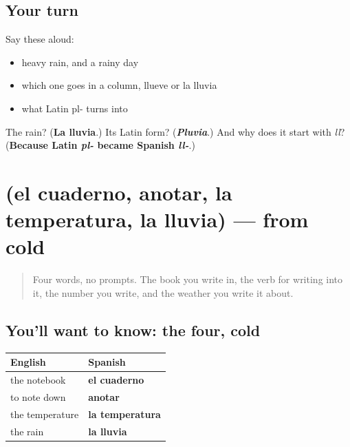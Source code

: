 \subsection*{Your turn}
Say these aloud:

\begin{itemize}
\raggedright
  \item heavy rain, and a rainy day
  \item which one goes in a column, llueve or la lluvia
  \item what Latin pl- turns into
\end{itemize}

\begin{tcolorbox}[breakable,colback=teal!4,colframe=teal!35!black,title={Before you move on}]
The rain? (\textbf{La lluvia}.) Its Latin form? (\emph{\textbf{Pluvia}}.) And why does it start with \emph{ll}? (\textbf{Because Latin \emph{pl-} became Spanish \emph{ll-}}.)
\end{tcolorbox}
\section[(el cuaderno, anotar, la temperatura …]{(el cuaderno, anotar, la temperatura, la lluvia) — from cold}

\label{lesson:ES-R465-repaso-apunte}



\begin{quote}
Four words, no prompts. The book you write in, the verb for writing into it, the number you write, and the weather you write it about.
\end{quote}

\subsection*{You'll want to know: the four, cold}
\noindent
\begin{tabularx}{\linewidth}{@{}>{\raggedright\arraybackslash}X>{\raggedright\arraybackslash}X@{}}
\toprule
\textbf{English} & \textbf{Spanish} \\
\midrule
the notebook & \textbf{el cuaderno} \\
to note down & \textbf{anotar} \\
the temperature & \textbf{la temperatura} \\
the rain & \textbf{la lluvia} \\
\bottomrule
\end{tabularx}

